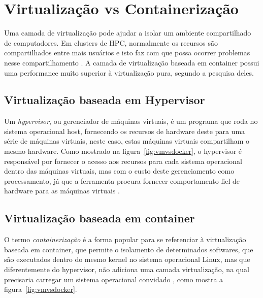 \documentclass[twoside,english,brazilian]{UNISINOSartigo}
\begin{document}
\section{Virtualização vs Containerização}
\label{virtualization}

Uma camada de virtualização pode ajudar a isolar um ambiente compartilhado de computadores. Em clusters de HPC, normalmente os recursos são compartilhados entre mais usuários e isto faz com que possa ocorrer problemas nesse compartilhamento \cite{Xavier2013}.
A camada de virtualização baseada em container possui uma performance muito superior à virtualização pura, segundo a pesquisa deles.



\subsection{Virtualização baseada em Hypervisor}
Um \textit{hypervisor}, ou gerenciador de máquinas virtuais, é um programa que roda no sistema operacional host, fornecendo os recursos de hardware deste para uma série de máquinas virtuais, neste caso, estas máquinas virtuais compartilham o mesmo hardware. Como mostrado na figura~\ref{fig:vmvsdocker}, o hypervisor é responsável por fornecer o acesso aos recursos para cada sistema operacional dentro das máquinas virtuais, mas com o custo deste gerenciamento como processamento, já que a ferramenta procura fornecer comportamento fiel de hardware para as máquinas virtuais \cite{Zhang2016}.

\subsection{Virtualização baseada em container}

O termo \textit{containerização} é a forma popular para se referenciar à virtualização baseada em container, que permite o isolamento de determinados softwares, que são executados dentro do mesmo kernel no sistema operacional Linux, mas que diferentemente do hypervisor, não adiciona uma camada virtualização, na qual precisaria carregar um sistema operacional convidado \cite{Zhang2016}, como mostra a figura~\ref{fig:vmvsdocker}.
\cite{Dua2014}
\end{document}
